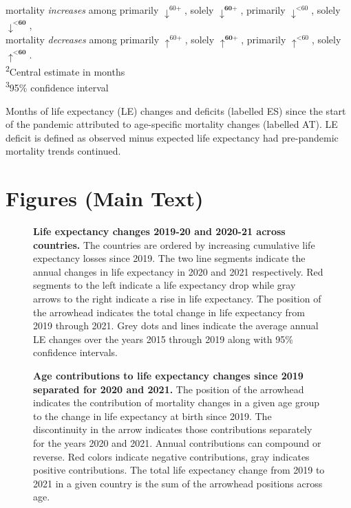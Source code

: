\documentclass[12pt]{article}
\begin{document}
\begin{table}[ht]
\begin{minipage}{\linewidth}
    mortality \emph{increases} among
    {primarily $\downarrow^{\text{60+}}$},
    {solely $\downarrow^{\textbf{60+}}$},
    {primarily $\downarrow^{\text{<60}}$},
    {solely $\downarrow^{\textbf{<60}}$}, \\
    mortality \emph{decreases} among
    {primarily $\uparrow^{\text{60+}}$},
    {solely $\uparrow^{\textbf{60+}}$},
    {primarily $\uparrow^{\text{<60}}$},
    {solely $\uparrow^{\textbf{<60}}$}. \\
    \textsuperscript{2}Central estimate in months \\
    \textsuperscript{3}95\% confidence interval \\
    \end{minipage}
    \caption{Months of life expectancy (LE) changes and deficits (labelled ES) since the start of the pandemic attributed to age-specific mortality changes (labelled AT). LE deficit is defined as observed minus expected life expectancy had pre-pandemic mortality trends continued.}
    \label{tab:arriaga}
    \end{table}

\clearpage
\section*{Figures (Main Text)}

\begin{figure}[ht!]
    \centering
    \caption{\textbf{Life expectancy changes 2019-20 and 2020-21 across countries.} The countries are ordered by increasing cumulative life expectancy losses since 2019. The two line segments indicate the annual changes in life expectancy in 2020 and 2021 respectively. Red segments to the left indicate a life expectancy drop while gray arrows to the right indicate a rise in life expectancy. The position of the arrowhead indicates the total change in life expectancy from 2019 through 2021.
    Grey dots and lines indicate the average annual LE changes over the years 2015 through 2019 along with 95\% confidence intervals.}
    \label{fig:figure-1}
\end{figure}

\begin{figure}[ht!]
    \centering
    \caption{\textbf{Age contributions to life expectancy changes since 2019 separated for 2020 and 2021.} The position of the arrowhead indicates the contribution of mortality changes in a given age group to the change in life expectancy at birth since 2019. The discontinuity in the arrow indicates those contributions separately for the years 2020 and 2021. Annual contributions can compound or reverse. Red colors indicate negative contributions, gray indicates positive contributions. The total life expectancy change from 2019 to 2021 in a given country is the sum of the arrowhead positions across age.}
    \label{fig:figure-2}
\end{figure}
\end{document}
